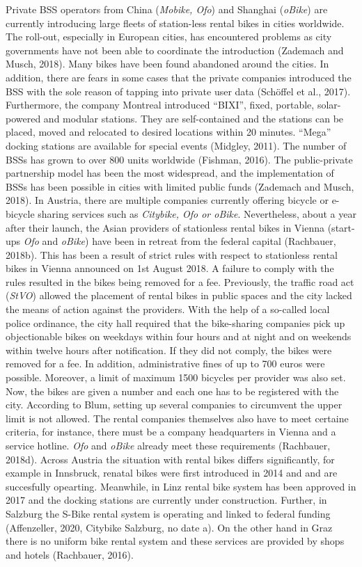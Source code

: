 \documentclass[
]{book}
\begin{document}
Private BSS operators from China (\emph{Mobike, Ofo}) and Shanghai (\emph{oBike}) are currently introducing large fleets of station-less rental bikes in cities worldwide. The roll-out, especially in European cities, has encountered problems as city governments have not been able to coordinate the introduction (Zademach and Musch, 2018). Many bikes have been found abandoned around the cities. In addition, there are fears in some cases that the private companies introduced the BSS with the sole reason of tapping into private user data (Schöffel et al., 2017).
Furthermore, the company Montreal introduced ``BIXI'', fixed, portable, solar-powered and modular stations. They are self-contained and the stations can be placed, moved and relocated to desired locations within 20 minutes. ``Mega'' docking stations are available for special events (Midgley, 2011).
The number of BSSs has grown to over 800 units worldwide (Fishman, 2016). The public-private partnership model has been the most widespread, and the implementation of BSSs has been possible in cities with limited public funds (Zademach and Musch, 2018).
In Austria, there are multiple companies currently offering bicycle or e-bicycle sharing services such as \emph{Citybike, Ofo or oBike}. Nevertheless, about a year after their launch, the Asian providers of stationless rental bikes in Vienna (start-ups \emph{Ofo} and \emph{oBike}) have been in retreat from the federal capital (Rachbauer, 2018b). This has been a result of strict rules with respect to stationless rental bikes in Vienna announced on 1st August 2018. A failure to comply with the rules resulted in the bikes being removed for a fee. Previously, the traffic road act (\emph{StVO}) allowed the placement of rental bikes in public spaces and the city lacked the means of action against the providers. With the help of a so-called local police ordinance, the city hall required that the bike-sharing companies pick up objectionable bikes on weekdays within four hours and at night and on weekends within twelve hours after notification. If they did not comply, the bikes were removed for a fee. In addition, administrative fines of up to 700 euros were possible. Moreover, a limit of maximum 1500 bicycles per provider was also set. Now, the bikes are given a number and each one has to be registered with the city. According to Blum, setting up several companies to circumvent the upper limit is not allowed. The rental companies themselves also have to meet certaine criteria, for instance, there must be a company headquarters in Vienna and a service hotline. \emph{Ofo} and \emph{oBike} already meet these requirements (Rachbauer, 2018d).
Across Austria the situation with rental bikes differs significantly, for example in Innsbruck, renatal bikes were first introduced in 2014 and and are succesfully opearting. Meanwhile, in Linz rental bike system has been approved in 2017 and the docking stations are currently under construction. Further, in Salzburg the S-Bike rental system is operating and linked to federal funding (Affenzeller, 2020, Citybike Salzburg, no date a). On the other hand in Graz there is no uniform bike rental system and these services are provided by shops and hotels (Rachbauer, 2016).
\end{document}
